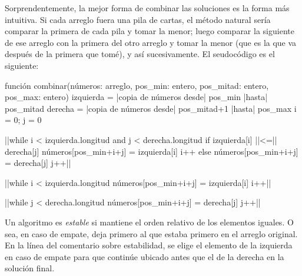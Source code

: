 Sorprendentemente, la mejor forma de combinar las soluciones es la forma más intuitiva. Si cada arreglo fuera una pila de cartas, el método natural sería comparar la primera de cada pila y tomar la menor; luego comparar la siguiente de ese arreglo con la primera del otro arreglo y tomar la menor (que es la que va después de la primera que tomé), y así sucesivamente. El seudocódigo es el siguiente:
\begin{pseudocode}
función combinar(números: arreglo, pos_min: entero, pos_mitad: entero, pos_max: entero)
    izquierda = |\textrm{copia de números desde}| pos_min |\textrm{hasta}| pos_mitad
    derecha = |\textrm{copia de números desde}| pos_mitad+1 |\textrm{hasta}| pos_max
    i = 0; j = 0

    ||while i < izquierda.longitud and j < derecha.longitud
        if izquierda[i] ||<=|| derecha[j]
            números[pos_min+i+j] = izquierda[i]
            i++
        else
            números[pos_min+i+j] = derecha[j]
            j++||

    ||while i < izquierda.longitud
        números[pos_min+i+j] = izquierda[i]
        i++||

    ||while j < derecha.longitud
        números[pos_min+i+j] = derecha[j]
        j++||
\end{pseudocode}
\begin{annotations}
\end{annotations}

Un algoritmo es \emph{estable} si mantiene el orden relativo de los elementos iguales. O sea, en caso de empate, deja primero al que estaba primero en el arreglo original. En la línea del comentario sobre estabilidad, se elige el elemento de la izquierda en caso de empate para que continúe ubicado antes que el de la derecha en la solución final.

